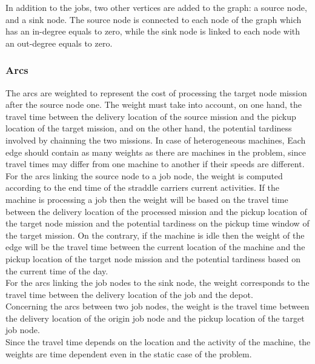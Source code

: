 \documentclass[a4paper,10pt]{article}
\begin{document}
In addition to the jobs, two other vertices are added to the graph: a source node, and a sink node. The source node is connected to each node of the graph which has an in-degree equals to zero, while the sink node is linked to each node with an out-degree equals to zero. %


\subsubsection{Arcs}

The arcs are weighted to represent the cost of processing the target node mission after the source node one. The weight must take into account, on one hand, the travel time between the delivery location of the source mission and the pickup location of the target mission, and on the other hand, the potential tardiness involved by chainning the two missions. In case of heterogeneous machines, Each edge should contain as many weights as there are machines in the problem, since travel times may differ from one machine to another if their speeds are different.\\

For the arcs linking the source node to a job node, the weight is computed according to the end time of the straddle carriers current activities. If the machine is processing a job then the weight will be based on the travel time between the delivery location of the processed mission and the pickup location of the target node mission and the potential tardiness on the pickup time window of the target mission. On the contrary, if the machine is idle then the weight of the edge will be the travel time between the current location of the machine and the pickup location of the target node mission and the potential tardiness based on the current time of the day.\\

For the arcs linking the job nodes to the sink node, the weight corresponds to the travel time between the delivery location of the job and the depot.\\

Concerning the arcs between two job nodes, the weight is the travel time between the delivery location of the origin job node and the pickup location of the target job node.\\

Since the travel time depends on the location and the activity of the machine, the weights are time dependent even in the static case of the problem.\\
\end{document}
